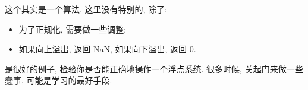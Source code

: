 \documentclass[a4paper]{ctexart}
\begin{document}
{%

 这个其实是一个算法, 
这里没有特别的, 除了:
\begin{itemize}
\item 为了正规化, 需要做一些调整;
\item 如果向上溢出, 返回 NaN, 如果向下溢出, 返回 $0$.
\end{itemize}

 是很好的例子,
检验你是否能正确地操作一个浮点系统. 很多时候, 关起门来做一些蠢事,
可能是学习的最好手段.

}
\end{document}
